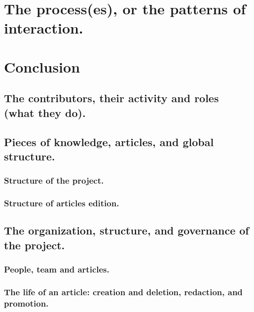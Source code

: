 \documentclass{misqdoc}
\begin{document}
\section{The process(es), or the patterns of interaction.}\label{sec:Process,-or-the}


\section{Conclusion}\label{sec:conclusion}

\subsection{The contributors, their activity and roles (what they do).}\label{subsec:The-contributors,-activity}


\subsection{Pieces of knowledge, articles, and global structure.}\label{subsec:The-pieces-of-knowledge}


\subsubsection{Structure of the project.}

\subsubsection{Structure of articles edition.}


\subsection{The organization, structure, and governance of the project.}


\subsubsection{People, team and articles.}

\subsubsection{The life of an article: creation and deletion, redaction, and promotion.}

\end{document}
